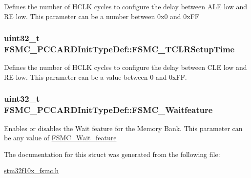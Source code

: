 \label{structFSMC__PCCARDInitTypeDef_ac83f977e01623595e0aa8dd0b1eb3fcc}
Defines the number of HCLK cycles to configure the delay between ALE low and RE low. This parameter can be a number between 0x0 and 0xFF \hypertarget{structFSMC__PCCARDInitTypeDef_a15db9675791f6f9c7fd82fe1084ff694}{
\subsubsection[{FSMC\_\-TCLRSetupTime}]{\setlength{\rightskip}{0pt plus 5cm}uint32\_\-t {\bf FSMC\_\-PCCARDInitTypeDef::FSMC\_\-TCLRSetupTime}}}
\label{structFSMC__PCCARDInitTypeDef_a15db9675791f6f9c7fd82fe1084ff694}
Defines the number of HCLK cycles to configure the delay between CLE low and RE low. This parameter can be a value between 0 and 0xFF. \hypertarget{structFSMC__PCCARDInitTypeDef_a3ffd8c627ffe3ac90dfbfe93a8b97c26}{
\subsubsection[{FSMC\_\-Waitfeature}]{\setlength{\rightskip}{0pt plus 5cm}uint32\_\-t {\bf FSMC\_\-PCCARDInitTypeDef::FSMC\_\-Waitfeature}}}
\label{structFSMC__PCCARDInitTypeDef_a3ffd8c627ffe3ac90dfbfe93a8b97c26}
Enables or disables the Wait feature for the Memory Bank. This parameter can be any value of \hyperlink{group__FSMC__Wait__feature}{FSMC\_\-Wait\_\-feature} 

The documentation for this struct was generated from the following file:\begin{DoxyCompactItemize}
\item 
\hyperlink{stm32f10x__fsmc_8h}{stm32f10x\_\-fsmc.h}\end{DoxyCompactItemize}
